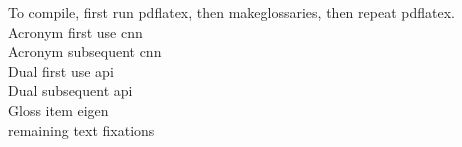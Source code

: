 \documentclass{article}
\begin{document}
\noindent
To compile, first run pdflatex, then makeglossaries, then repeat pdflatex.\\
Acronym first use \gls{cnn}\\
Acronym subsequent \gls{cnn}\\
Dual first use \gls{api}\\
Dual subsequent \gls{api}\\
Gloss item \gls{eigen}\\
remaining text \gls{fixations}

\printglossary[type=\acronymtype]
\printglossary[type=main]
\end{document}
